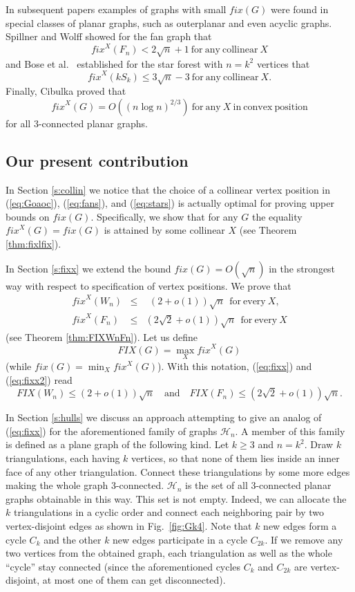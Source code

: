 \documentclass[reqno,12pt]{amsart}
\newcommand{\fix}[1]{\mathit{fix}(#1)}
\newcommand{\refeq}[1]{(\ref{eq:#1})}
\newcommand{\fixx}[1]{\mathit{fix}^X(#1)}
\newcommand{\FIX}[1]{\mathit{FIX}(#1)}
\newcommand{\calH}{{\mathcal H}}
\begin{document}
In subsequent papers \cite{SWo,Bose} examples of graphs with small $\fix G$
were found in special classes of planar graphs, such
as outerplanar and even acyclic graphs.
Spillner and Wolff \cite{SWo} showed for the fan graph that
\begin{equation}\label{eq:fans}
\fixx{F_n}<2\sqrt n+1\mathrm{\ for \ any\ collinear\ }X
\end{equation}
and Bose et al.\ \cite{Bose} established for the star forest with $n=k^2$ vertices that
\begin{equation}\label{eq:stars}
\fixx{kS_k}\le3\sqrt n-3\mathrm{\ for \ any\ collinear\ }X.
\end{equation}
Finally, Cibulka \cite{Cib} proved that
$$
\fixx{G}=O((n\log n)^{2/3})\mathrm{\ for\ any\ }X\mathrm{\ in\ convex\ position}
$$
for all 3-connected planar graphs.


\subsection{Our present contribution}\label{ss:contrib}
In Section \ref{s:collin} we notice that the choice of a collinear
vertex position in \refeq{Goaoc}, \refeq{fans}, and \refeq{stars}
is actually optimal for proving upper bounds on $\fix G$.
Specifically, we show that for any $G$ the equality $\fixx G=\fix G$
is attained by some collinear $X$ (see Theorem \ref{thm:fixlfix}).

In Section \ref{s:fixx} we extend the bound
$\fix G=O(\sqrt n)$ in the strongest way with respect to specification
of vertex positions. We prove that
\begin{eqnarray}
\fixx{W_n}&\le&\ \,(2+o(1))\sqrt n\mathrm{\ \ for\ every\ }X, \label{eq:fixx}\\
\fixx{F_n}&\le&(2\sqrt2+o(1))\sqrt n\mathrm{\ \ for\ every\ }X \label{eq:fixx2}
\end{eqnarray}
(see Theorem \ref{thm:FIXWnFn}).
Let us define
$$
\FIX G=\max_X\fixx G
$$
(while $\fix G=\min_X\fixx G$).
With this notation, \refeq{fixx} and \refeq{fixx2} read
$$
\FIX{W_n}\le(2+o(1))\sqrt n\quad\mbox{and}\quad\FIX{F_n}\le(2\sqrt2+o(1))\sqrt n.
$$

In Section \ref{s:hulls} we discuss an approach attempting to give
an analog of \refeq{fixx} for the aforementioned family of graphs
$\calH_n$. A member of this family is defined as a plane graph of the
following kind. 
Let $k\ge3$ and $n=k^2$. Draw $k$ triangulations, each having $k$ vertices,
so that none of them lies inside an inner face of any other
triangulation. Connect these triangulations by some more edges making
the whole graph 3-connected.
$\calH_n$ is the set of all 3-connected planar graphs obtainable in this way.
This set is not empty. Indeed, we can allocate the $k$ triangulations in a
cyclic order and connect each neighboring pair by two vertex-disjoint edges
as shown in Fig.~\ref{fig:Gk4}. Note that $k$ new edges form a cycle $C_k$
and the other $k$ new edges participate in a cycle $C_{2k}$. 
If we remove any two vertices from the obtained graph,
each triangulation as well as the whole ``cycle'' stay connected
(since the aforementioned cycles $C_k$ and $C_{2k}$ are vertex-disjoint,
at most one of them can get disconnected).
\end{document}
